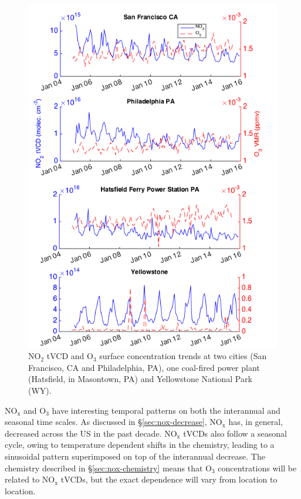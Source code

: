 \documentclass[a4paper,10pt,oneside]{article}
\newcommand{\ce}[1]{$\mathrm{#1}$}
\begin{document}
\begin{sloppy}
\begin{figure}
\centering
\includegraphics[width=0.95\columnwidth]{figs/four-site-trends.png} 
\caption{\ce{NO_2} tVCD and \ce{O_3} surface concentration trends at two cities (San Francisco, CA and Philadelphia, PA), one coal-fired power plant (Hatsfield, in Masontown, PA) and Yellowstone National Park (WY).}
\label{fig:trends}
\end{figure}

\ce{NO_x} and \ce{O_3} have interesting temporal patterns on both the interannual and seasonal time scales. As discussed in \S\ref{sec:nox-decrease}, \ce{NO_x} has, in general, decreased across the US in the past decade. \ce{NO_x} tVCDs also follow a seasonal cycle, owing to temperature dependent shifts in the chemistry, leading to a sinusoidal pattern superimposed on top of the interannual decrease.  The chemistry described in \S\ref{sec:nox-chemistry} means that \ce{O_3} concentrations will be related to \ce{NO_x} tVCDs, but the exact dependence will vary from location to location.


\end{sloppy}
\end{document}
